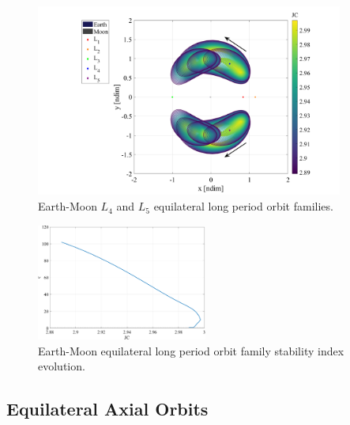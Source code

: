 \begin{figure}[ht]
    \centering
    \includegraphics[width=0.9\textwidth]{figures/LongPeriodFamily.pdf}
    \caption{Earth-Moon $L_{4}$ and $L_{5}$ equilateral long period orbit families.}
    \label{fig:longPeriod}
\end{figure}

\begin{figure}[ht]
    \centering
    \includegraphics[width=0.5\textwidth]{figures/LongPeriodStability.pdf}
    \caption{Earth-Moon equilateral long period orbit family stability index evolution.}
    \label{fig:longPeriodStability}
\end{figure}

\subsection{Equilateral Axial Orbits}
